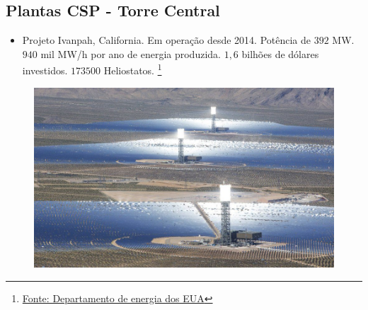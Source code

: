 \documentclass[12pt,notheorems,hyperref={pdfauthor= Rafael Nardi}]{beamer}
\begin{document}
\subsection{Plantas CSP - Torre Central}


\begin{frame}%

	\begin{itemize} \item Projeto Ivanpah, California. Em operação desde 2014.
		Potência de $392$ MW. $940$ mil MW/h por ano de energia produzida. $1,6$
		bilhões de dólares investidos. $173500$ Heliostatos.
\footnote{ \href{https://www.energy.gov/lpo/ivanpah}{Fonte: Departamento de energia dos EUA}} \end{itemize}

	\begin{figure}
		\centering
		\includegraphics[scale=0.3]{./Ivanpah4-960x576.jpg}
	\end{figure}

\end{frame}
\end{document}
